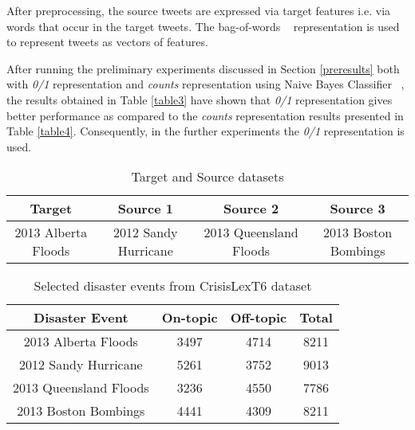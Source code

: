 After preprocessing, the source tweets are expressed via target features i.e. via words that occur in the target tweets. The bag-of-words ~\citep{bagofwords} representation is used to represent tweets as vectors of features. 

After running the preliminary experiments discussed in Section \ref{preresults} both with \textit{0/1} representation and \textit{counts} representation using Naive Bayes Classifier ~\citep{nb}, the results obtained in Table \ref{table3} have shown that \textit{0/1} representation gives better performance as compared to the \textit{counts} representation results presented in Table \ref{table4}. Consequently, in the further experiments the \textit{0/1} representation is used.


\begin{table}[ht]
    \begin{center}
    \caption{Target and Source datasets}
    \begin{tabular}[c]{|c|c|c|c|}
        \hline
        Target & Source 1 & Source 2 & Source 3 \\
        \hline
        2013 Alberta Floods & 2012 Sandy Hurricane & 2013 Queensland Floods & 2013 Boston Bombings \\
        \hline
    \end{tabular}
    \label{table1}
   \end{center}
\end{table}

\begin{table}[ht]
    \begin{center}
    \caption{Selected disaster events from CrisisLexT6 dataset}
    \begin{tabular}[c]{|c|c|c|c|}
        \hline
        Disaster Event & On-topic & Off-topic & Total \\
        \hline
        2013 Alberta Floods & 3497 & 4714 & 8211 \\
        2012 Sandy Hurricane & 5261 & 3752 & 9013 \\
        2013 Queensland Floods & 3236 & 4550 & 7786\\
        2013 Boston Bombings & 4441 & 4309 & 8211 \\
        \hline
    \end{tabular}
    \label{table2}
   \end{center}
\end{table}

